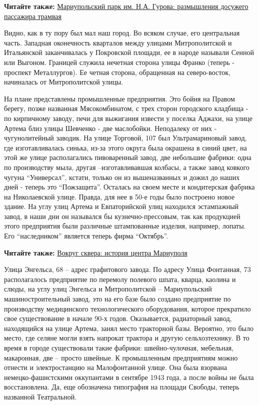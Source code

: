 \textbf{Читайте также:} \href{https://mrpl.city/blogs/view/mariupolskij-park-im-na-gurova-razmyshleniya-dosuzhego-passazhira-tramvaya}{%
Мариупольский парк им. Н.А. Гурова: размышления досужего пассажира трамвая}

Видно, как в ту пору был мал наш город. Во всяком случае, его центральная
часть. Западная оконечность кварталов между улицами Митрополитской и
Итальянской заканчивалась у Покровской площади, ее в народе называли Сенной или
Выгоном. Границей служила нечетная сторона улицы Франко (теперь - проспект
Металлургов). Ее четная сторона, обращенная на северо-восток, начиналась от
Митрополитской улицы.

На плане представлены промышленные предприятия. Это бойня на Правом берегу,
позже названная Мясокомбинатом, с трех сторон городского кладбища - по
кирпичному заводу, печи для выжигания извести у поселка Аджахи, на улице Артема
близ улицы Шевченко - две маслобойки. Неподалеку от них - чугунолитейный
заводик. На улице Торговой, 107 был Ультрамариновый завод, где изготавливалась
синька, из-за этого округа была окрашена в синий цвет, на этой же улице
располагались пивоваренный завод, две небольшие фабрики: одна по производству
мыла, другая –изготавливавшая колбасы, а также завод ковкого чугуна
\enquote{Универсал}, кстати, только он из вышеназванных и дожил до наших дней - теперь
это \enquote{Пожзащита}. Осталась на своем месте и кондитерская фабрика на Николаевской
улице. Правда, для нее в 50-е годы было построено новое здание. На углу улиц
Артема и Евпаторийской улиц находился эстампажный завод, в наши дни он
назывался бы кузнечно-прессовым, так как продукцией этого предприятия были
различные штампованные изделия, например, лопаты. Его \enquote{наследником} является
теперь фирма \enquote{Октябрь}.

\textbf{Читайте также:} \href{https://mrpl.city/blogs/view/vokrug-skvera-istoriya-tsentra-mariupolya}{%
Вокруг сквера: история центра Мариуполя}

Улица Энгельса, 68 – адрес графитового завода. По адресу Улица Фонтанная, 73
располагалось предприятие по перемолу полевого шпата, кварца, каолина и слюды,
на углу улиц Энгельса и Митрополитской – Мариупольский машиностроительный
завод, это на его базе было создано предприятие по производству медицинского
технологического оборудования, которое прекратило свое существование в начале
90-х годов. Оказывается, радиаторный завод, находящийся на улице Артема, занял
место тракторной базы. Вероятно, это было место, где селяне могли взять
напрокат трактора и другую сельхозтехнику. В то время в городе существовали
такие фабрики: швейно-чулочная, мебельная, макаронная, две – просто швейные. К
промышленным предприятиям можно отнести и электростанцию на Малофонтанной
улице. Она была взорвана немецко-фашистскими оккупантами в сентябре 1943 года,
а после войны не была восстановлена. Да, еще обозначена типография на площади
Свободы, теперь названной Театральной.

